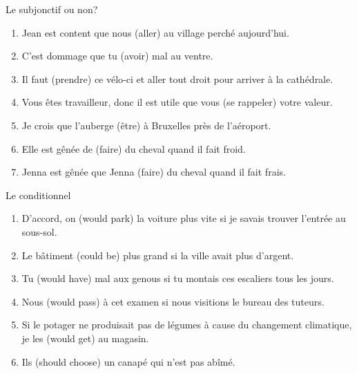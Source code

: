\documentclass{beamer}
\begin{document}
  \begin{frame}{Le subjonctif ou non?}
    \begin{enumerate}
      \item Jean est content que nous \underline{} (aller) au village perché aujourd'hui.
      \item C'est dommage que tu \underline{} (avoir) mal au ventre.
      \item Il faut \underline{} (prendre) ce vélo-ci et aller tout droit pour arriver à la cathédrale.
      \item Vous êtes travailleur, donc il est utile que vous \underline{} (se rappeler) votre valeur.
      \item Je crois que l'auberge \underline{} (être) à Bruxelles près de l'aéroport.
      \item Elle est gênée de \underline{} (faire) du cheval quand il fait froid.
      \item Jenna est gênée que Jenna \underline{} (faire) du cheval quand il fait frais.
    \end{enumerate}
  \end{frame}

  \begin{frame}{Le conditionnel}
    \begin{enumerate}
      \item D'accord, on \underline{} (would park) la voiture plus vite si je savais trouver l'entrée au sous-sol.
      \item Le bâtiment \underline{} (could be) plus grand si la ville avait plus d'argent.
      \item Tu \underline{} (would have) mal aux genous si tu montais ces escaliers tous les jours.
      \item Nous \underline{} (would pass) à cet examen si nous visitions le bureau des tuteurs.
      \item Si le potager ne produisait pas de légumes à cause du changement climatique, je les \underline{} (would get) au magasin.
      \item Ils \underline{} (should choose) un canapé qui n'est pas abîmé.
    \end{enumerate}
  \end{frame}
\end{document}
